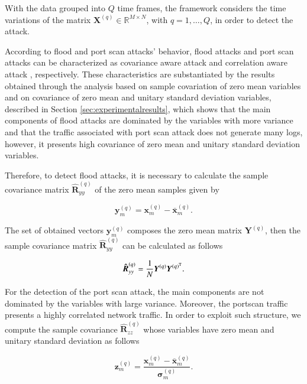 \documentclass[review]{elsarticle}
\begin{document}
With the data grouped into $Q$ time frames, the framework considers the time variations of the matrix $\boldsymbol{X}^{(q)} \in \mathbb{R}^{M\times{N}}$, with $q = 1, \ldots, Q$, in order to detect the attack. 

According to flood and port scan attacks' behavior, flood attacks and port scan attacks can be characterized as covariance aware attack \citep{jin2004covariance} and correlation aware attack \citep{lakhina2005mining}, respectively. These characteristics are substantiated by the results obtained through the analysis based on sample covariation of zero mean variables and on covariance of zero mean and unitary standard deviation variables, described in Section \ref{sec:experimentalresults}, which shows that the main components of flood attacks are dominated by the variables with more variance and that the traffic associated with port scan attack does not generate many logs, however, it presents high covariance of zero mean and unitary standard deviation variables.

Therefore, to detect flood attacks, it is necessary to calculate the sample covariance matrix $\boldsymbol{\hat{R}}_{yy}^{(q)}$ of the zero mean samples given by

\begin{equation}\label{eq:eq02}
\boldsymbol{y}_{m}^{(q)} = \boldsymbol{x}_{m}^{(q)} - \bar{\boldsymbol{x}}_{m}^{(q)}.
\end{equation}

The set of obtained vectors $\boldsymbol{y}_{m}^{(q)}$ composes the zero mean matrix $\boldsymbol{Y}^{(q)}$, then the sample covariance matrix $\boldsymbol{\hat{R}}_{yy}^{(q)}$ can be calculated as follows

\begin{equation}\label{eq:eq03}
\boldsymbol{\hat{R}}_{yy}^{(q)} = \frac{1}{N}\boldsymbol{Y}^{(q)}\boldsymbol{Y}^{(q)^{\rm T}}.
\end{equation}

For the detection of the port scan attack, the main components are not dominated by the variables with large variance. Moreover, the portscan traffic presents a highly correlated network traffic. In order to exploit such structure, we compute the sample covariance $\boldsymbol{\hat{R}}_{zz}^{(q)}$ whose variables have zero mean and unitary standard deviation as follows

\begin{equation}\label{eq:eq04}
\boldsymbol{z}_{m}^{(q)} = \frac{\boldsymbol{x}_{m}^{(q)} - \bar{\boldsymbol{x}}_{m}^{(q)}}{\boldsymbol{\sigma}_{m}^{(q)}}.
\end{equation}
\end{document}

